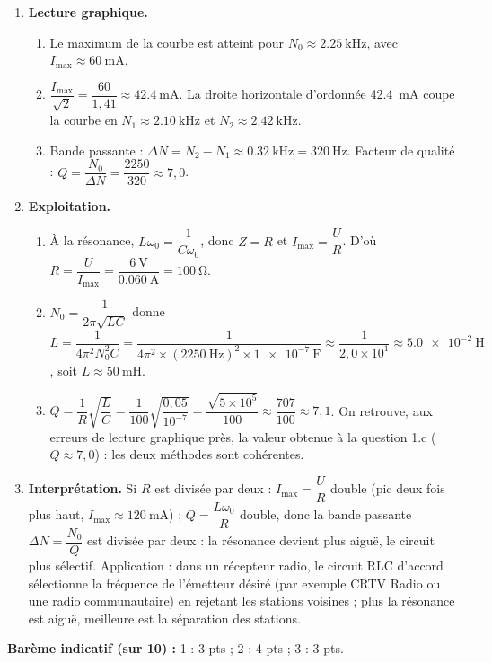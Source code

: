 \documentclass[11pt]{article}
\newcommand{\cle}[1]{{\popxbold\color{popdark}#1}}
\begin{document}
\begin{corrige}
\begin{enumerate}
\item \textbf{Lecture graphique.}
\begin{enumerate}
\item Le maximum de la courbe est atteint pour $N_0 \approx \SI{2,25}{\kilo\hertz}$, avec $I_{\max} \approx \SI{60}{\milli\ampere}$.
\item $\dfrac{I_{\max}}{\sqrt{2}} = \dfrac{60}{1{,}41} \approx \SI{42,4}{\milli\ampere}$. La droite horizontale d'ordonnée \SI{42,4}{\milli\ampere} coupe la courbe en $N_1 \approx \SI{2,10}{\kilo\hertz}$ et $N_2 \approx \SI{2,42}{\kilo\hertz}$.
\item Bande passante : $\Delta N = N_2 - N_1 \approx \SI{0,32}{\kilo\hertz} = \SI{320}{\hertz}$. Facteur de qualité : $Q = \dfrac{N_0}{\Delta N} = \dfrac{2250}{320} \approx 7{,}0$.
\end{enumerate}
\item \textbf{Exploitation.}
\begin{enumerate}
\item À la résonance, $L\omega_0 = \dfrac{1}{C\omega_0}$, donc $Z = R$ et $I_{\max} = \dfrac{U}{R}$. D'où $R = \dfrac{U}{I_{\max}} = \dfrac{\SI{6}{\volt}}{\SI{0,060}{\ampere}} = \SI{100}{\ohm}$.
\item $N_0 = \dfrac{1}{2\pi\sqrt{LC}}$ donne $L = \dfrac{1}{4\pi^2 N_0^2 C} = \dfrac{1}{4\pi^2 \times (\SI{2250}{\hertz})^2 \times \SI{1e-7}{\farad}} \approx \dfrac{1}{2,0\times10^{1}} \approx \SI{5,0e-2}{\henry}$, soit $L \approx \SI{50}{\milli\henry}$.
\item $Q = \dfrac{1}{R}\sqrt{\dfrac{L}{C}} = \dfrac{1}{100}\sqrt{\dfrac{0,05}{10^{-7}}} = \dfrac{\sqrt{5\times10^{5}}}{100} \approx \dfrac{707}{100} \approx 7{,}1$. On retrouve, aux erreurs de lecture graphique près, la valeur obtenue à la question 1.c ($Q \approx 7{,}0$) : les deux méthodes sont cohérentes.
\end{enumerate}
\item \textbf{Interprétation.} Si $R$ est divisée par deux : $I_{\max} = \dfrac{U}{R}$ double (pic deux fois plus haut, $I_{\max} \approx \SI{120}{\milli\ampere}$) ; $Q = \dfrac{L\omega_0}{R}$ double, donc la bande passante $\Delta N = \dfrac{N_0}{Q}$ est divisée par deux : la résonance devient plus aiguë, le circuit plus \cle{sélectif}. Application : dans un récepteur radio, le circuit RLC d'accord sélectionne la fréquence de l'émetteur désiré (par exemple CRTV Radio ou une radio communautaire) en rejetant les stations voisines ; plus la résonance est aiguë, meilleure est la séparation des stations.
\end{enumerate}
\textbf{Barème indicatif (sur 10) :} 1 : 3 pts ; 2 : 4 pts ; 3 : 3 pts.


\end{corrige}
\end{document}
